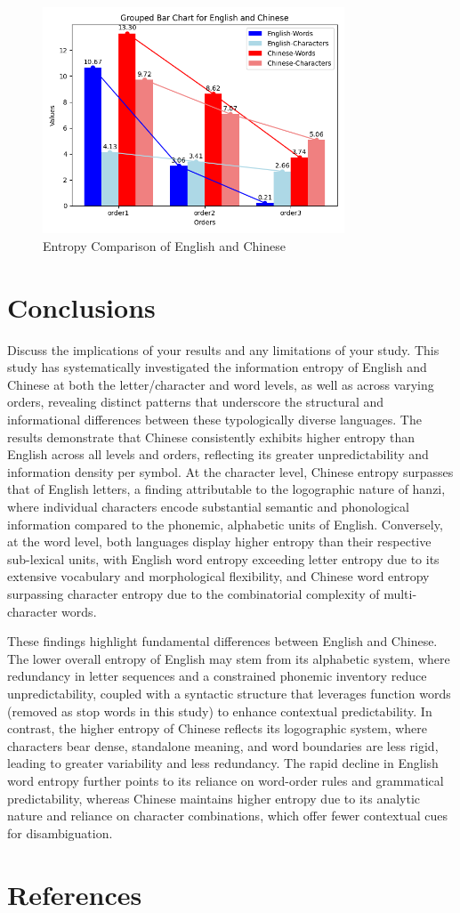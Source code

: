 \documentclass[12pt]{article}
\begin{document}
\begin{figure}[h!]
\centering
\includegraphics[width=0.8\textwidth]{entropy.png}
\caption{Entropy Comparison of English and Chinese}
\label{fig:entropy_comparison}
\end{figure}

\section*{\centering Conclusions}
Discuss the implications of your results and any limitations of your study.
This study has systematically investigated the information entropy of English and Chinese at both the letter/character and word levels, as well as across varying orders, revealing distinct patterns that underscore the structural and informational differences between these typologically diverse languages. The results demonstrate that Chinese consistently exhibits higher entropy than English across all levels and orders, reflecting its greater unpredictability and information density per symbol. At the character level, Chinese entropy surpasses that of English letters, a finding attributable to the logographic nature of hanzi, where individual characters encode substantial semantic and phonological information compared to the phonemic, alphabetic units of English. Conversely, at the word level, both languages display higher entropy than their respective sub-lexical units, with English word entropy exceeding letter entropy due to its extensive vocabulary and morphological flexibility, and Chinese word entropy surpassing character entropy due to the combinatorial complexity of multi-character words.

These findings highlight fundamental differences between English and Chinese. The lower overall entropy of English may stem from its alphabetic system, where redundancy in letter sequences and a constrained phonemic inventory reduce unpredictability, coupled with a syntactic structure that leverages function words (removed as stop words in this study) to enhance contextual predictability. In contrast, the higher entropy of Chinese reflects its logographic system, where characters bear dense, standalone meaning, and word boundaries are less rigid, leading to greater variability and less redundancy. The rapid decline in English word entropy further points to its reliance on word-order rules and grammatical predictability, whereas Chinese maintains higher entropy due to its analytic nature and reliance on character combinations, which offer fewer contextual cues for disambiguation.
\section*{\centering References}




\end{document}
